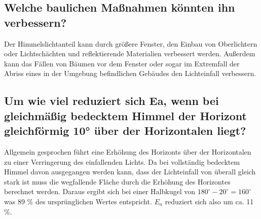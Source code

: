 \subsection{Welche baulichen Maßnahmen könnten ihn verbessern?}
Der Himmelslichtanteil kann durch größere Fenster, den Einbau von Oberlichtern oder Lichtschächten und reflektierende Materialien verbessert werden. Außerdem kann das Fällen von Bäumen vor dem Fenster oder sogar im Extremfall der Abriss eines in der Umgebung befindlichen Gebäudes den Lichteinfall verbessern.

\subsection{Um wie viel reduziert sich Ea, wenn bei gleichmäßig bedecktem Himmel der Horizont
gleichförmig 10° über der Horizontalen liegt?}

Allgemein gesprochen führt eine Erhöhung des Horizonts über der Horizontalen zu einer Verringerung des einfallenden Lichts.
Da bei vollständig bedecktem Himmel davon ausgegangen werden kann, dass der Lichteinfall von überall gleich stark ist muss die wegfallende Fläche durch die Erhöhung des Horizontes berechnet werden. Daraus ergibt sich bei einer Halbkugel von $180^{\circ}-20^{\circ}=160^{\circ}$ was 89 \% des ursprünglichen Wertes entspricht. $E_a$ reduziert sich also um ca. 11 \%. 




